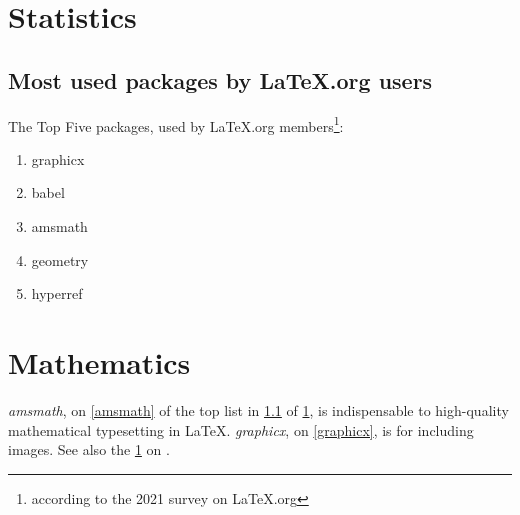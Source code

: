\documentclass{book}
\begin{document}
\chapter{Statistics}
\label{stats}
\section{Most used packages by LaTeX.org users}
\label{packages}
The Top Five packages, used by LaTeX.org
members\footnote{according to the 2021 survey on
LaTeX.org\label{project}}:
\begin{enumerate}
  \item graphicx\label{graphicx}
  \item babel
  \item amsmath\label{amsmath}
  \item geometry
  \item hyperref
\end{enumerate}
\chapter{Mathematics}
\label{maths}
\emph{amsmath}, on \cref{amsmath} of the top list in 
\cref{packages} of \cref{stats}, is indispensable to
high-quality mathematical typesetting in \LaTeX.
\emph{graphicx}, on \cref{graphicx}, is for
including images.
See also the \cref{project} on .
\end{document}
